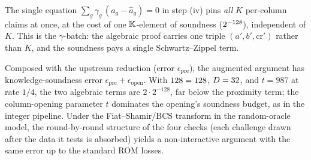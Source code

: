 \begin{remark}
The single equation $\sum_g \gamma_g\,(a_g-\widehat a_g)=0$ in step (iv)
pins \emph{all} $K$ per-column claims at once, at the cost of one
$\mathbb{K}$-element of soundness ($2^{-128}$), independent of $K$. This is the
$\gamma$-batch: the algebraic proof carries one triple $(a',b',\mathrm{cr}')$
rather than $K$, and the soundness pays a single Schwartz--Zippel term.
\end{remark}

\begin{remark}
Composed with the upstream reduction (error $\epsilon_{\mathrm{pre}}$),
the augmented argument has knowledge-soundness error
$\epsilon_{\mathrm{pre}} + \epsilon_{\mathrm{open}}$. With
$128 = 128$, $D = 32$, and $t = 987$ at rate $1/4$, the two
algebraic terms are $2\cdot 2^{-128}$, far below the proximity term; the
column-opening parameter $t$ dominates the opening's soundness budget, as
in the integer pipeline. Under the Fiat--Shamir/BCS transform in the
random-oracle model, the round-by-round structure of the four checks
(each challenge drawn after the data it tests is absorbed) yields a
non-interactive argument with the same error up to the standard ROM
losses.
\end{remark}
